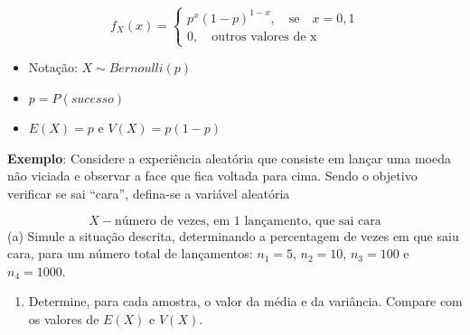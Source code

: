 \documentclass[
]{book}
\providecommand{\tightlist}{%
  \setlength{\itemsep}{0pt}\setlength{\parskip}{0pt}}
\begin{document}
\[f_{X}(x) = \begin{cases}
p^{x}(1-p)^{1-x}, \quad \text{se} \quad x=0,1 \\
0, \quad \text{outros valores de x}
\end{cases}\]

\begin{itemize}
\item
  Notação: \(X \sim Bernoulli(p)\)
\item
  \(p=P(sucesso)\)
\item
  \(E(X)=p\) e \(V(X)=p(1-p)\)
\end{itemize}

\textbf{Exemplo}: Considere a experiência aleatória que consiste em lançar
uma moeda não viciada e observar a face que fica voltada para cima.
Sendo o objetivo verificar se sai ``cara'', defina-se a variável aleatória

\[X - \text{número de vezes, em 1 lançamento, que sai cara}\] (a) Simule
a situação descrita, determinando a percentagem de vezes em que saiu
cara, para um número total de lançamentos: \(n_1 = 5\), \(n_2=10\),
\(n_3=100\) e \(n_4=1000\).

\begin{enumerate}
\def\labelenumi{(\alph{enumi})}
\setcounter{enumi}{1}
\tightlist
\item
  Determine, para cada amostra, o valor da média e da variância.
  Compare com os valores de \(E(X)\) e \(V(X)\).
\end{enumerate}
\end{document}
